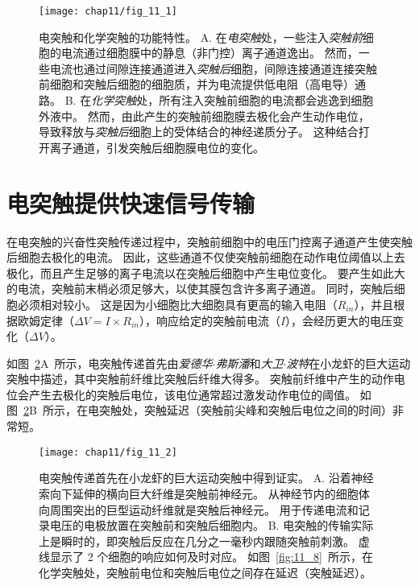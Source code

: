 \begin{figure}[htbp]
	\centering
	\texttt{[image: chap11/fig\_11\_1]}
	\caption{电突触和化学突触的功能特性。
		A. 在\textit{电突触}处，一些注入\textit{突触前}细胞的电流通过细胞膜中的静息（非门控）离子通道逸出。
		然而，一些电流也通过间隙连接通道进入\textit{突触后}细胞，间隙连接通道连接突触前细胞和突触后细胞的细胞质，并为电流提供低电阻（高电导）通路。
		B. 在\textit{化学突触}处，所有注入突触前细胞的电流都会逃逸到细胞外液中。
		然而，由此产生的突触前细胞膜去极化会产生动作电位，导致释放与\textit{突触后}细胞上的受体结合的神经递质分子。
		这种结合打开离子通道，引发突触后细胞膜电位的变化。}
	\label{fig:11_1}
\end{figure}


\section{电突触提供快速信号传输}

在电突触的兴奋性突触传递过程中，突触前细胞中的电压门控离子通道产生使突触后细胞去极化的电流。
因此，这些通道不仅使突触前细胞在动作电位阈值以上去极化，而且产生足够的离子电流以在突触后细胞中产生电位变化。
要产生如此大的电流，突触前末梢必须足够大，以使其膜包含许多离子通道。
同时，突触后细胞必须相对较小。
这是因为小细胞比大细胞具有更高的输入电阻（$R_{in}$），并且根据欧姆定律（$\Delta V = I \times R_{in}$），响应给定的突触前电流（$I$），会经历更大的电压变化（$\Delta V$）。


如图~\ref{fig:11_2}A~所示，电突触传递首先由\textit{爱德华$\cdot$弗斯潘}和\textit{大卫$\cdot$波特}在小龙虾的巨大运动突触中描述，其中突触前纤维比突触后纤维大得多。
突触前纤维中产生的动作电位会产生去极化的突触后电位，该电位通常超过激发动作电位的阈值。
如图~\ref{fig:11_2}B~所示，在电突触处，突触延迟（突触前尖峰和突触后电位之间的时间）非常短。


\begin{figure}[htbp]
	\centering
	\texttt{[image: chap11/fig\_11\_2]}
	\caption{电突触传递首先在小龙虾的巨大运动突触中得到证实\cite{furshpan1959transmission,furshpan1957mechanism}。 
		A. 沿着神经索向下延伸的横向巨大纤维是突触前神经元。
		从神经节内的细胞体向周围突出的巨型运动纤维就是突触后神经元。
		用于传递电流和记录电压的电极放置在突触前和突触后细胞内。
		B. 电突触的传输实际上是瞬时的，即突触后反应在几分之一毫秒内跟随突触前刺激。
		虚线显示了 2 个细胞的响应如何及时对应。
		如图~\ref{fig:11_8}~所示，在化学突触处，突触前电位和突触后电位之间存在延迟（突触延迟）。}
	\label{fig:11_2}
\end{figure}


